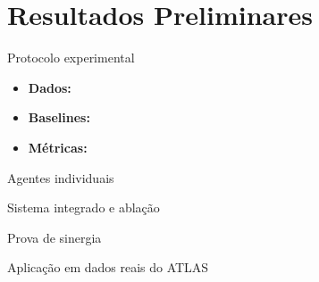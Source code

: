 
\section{Resultados Preliminares}

\begin{frame}{Protocolo experimental}
  \begin{itemize}
    \item \textbf{Dados:} 
    \item \textbf{Baselines:} \pendente{}
    \item \textbf{Métricas:} 
  \end{itemize}
\end{frame}

\begin{frame}{Agentes individuais}
  \centering
\end{frame}

\begin{frame}{Sistema integrado e ablação}
  \begin{block}{Prova de sinergia}
  \end{block}
  \vspace{0.4em}
\end{frame}

\begin{frame}{Aplicação em dados reais do ATLAS}
  \centering
\end{frame}

